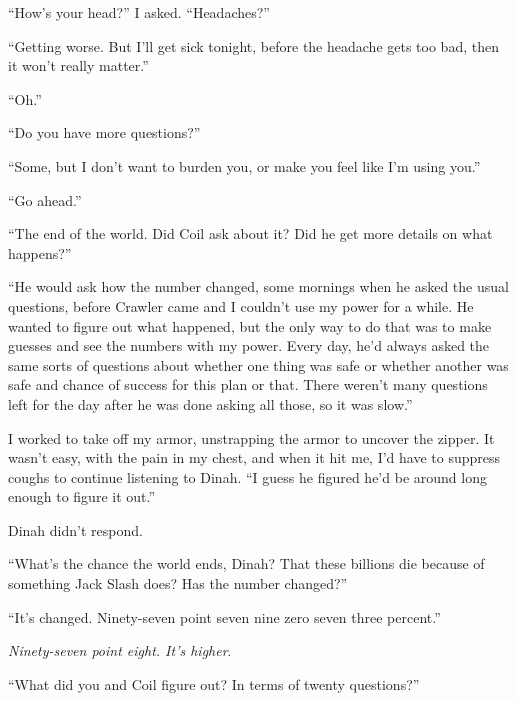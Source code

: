 ``How's your head?'' I asked.  ``Headaches?''



``Getting worse.  But I'll get sick tonight, before the headache gets too bad, then it won't really matter.''



``Oh.''



``Do you have more questions?''



``Some, but I don't want to burden you, or make you feel like I'm using you.''



``Go ahead.''



``The end of the world.  Did Coil ask about it?  Did he get more details on what happens?''



``He would ask how the number changed, some mornings when he asked the usual questions, before Crawler came and I couldn't use my power for a while.  He wanted to figure out what happened, but the only way to do that was to make guesses and see the numbers with my power.  Every day, he'd always asked the same sorts of questions about whether one thing was safe or whether another was safe and chance of success for this plan or that.  There weren't many questions left for the day after he was done asking all those, so it was slow.''



I worked to take off my armor, unstrapping the armor to uncover the zipper.  It wasn't easy, with the pain in my chest, and when it hit me, I'd have to suppress coughs to continue listening to Dinah.  ``I guess he figured he'd be around long enough to figure it out.''



Dinah didn't respond.



``What's the chance the world ends, Dinah?  That these billions die because of something Jack Slash does?  Has the number changed?''



``It's changed.  Ninety-seven point seven nine zero seven three percent.''



\emph{Ninety-seven point eight.  It's higher}.



``What did you and Coil figure out?  In terms of twenty questions?''



